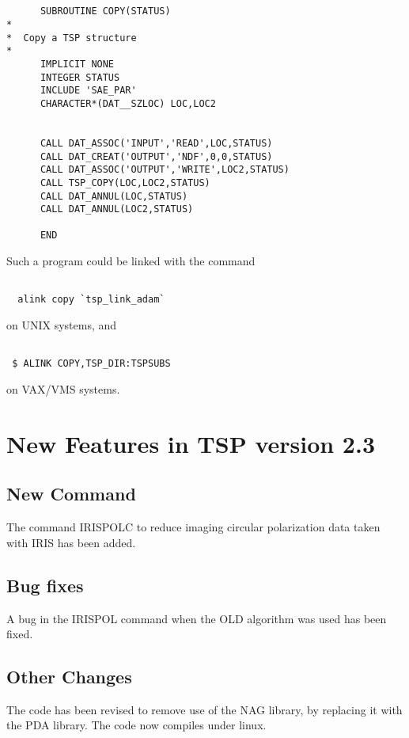 \begin{verbatim}


      SUBROUTINE COPY(STATUS)
*
*  Copy a TSP structure
*
      IMPLICIT NONE
      INTEGER STATUS
      INCLUDE 'SAE_PAR'
      CHARACTER*(DAT__SZLOC) LOC,LOC2


      CALL DAT_ASSOC('INPUT','READ',LOC,STATUS)
      CALL DAT_CREAT('OUTPUT','NDF',0,0,STATUS)
      CALL DAT_ASSOC('OUTPUT','WRITE',LOC2,STATUS)
      CALL TSP_COPY(LOC,LOC2,STATUS)
      CALL DAT_ANNUL(LOC,STATUS)
      CALL DAT_ANNUL(LOC2,STATUS)

      END

\end{verbatim}

Such a program could be linked with the command

\begin{verbatim}

  alink copy `tsp_link_adam`
\end{verbatim}
on UNIX systems, and


\begin{verbatim}

 $ ALINK COPY,TSP_DIR:TSPSUBS

\end{verbatim}
on VAX/VMS systems.

\section{New Features in TSP version 2.3}

\subsection{New Command}

The command IRISPOLC to reduce imaging circular polarization data taken with
IRIS has been added.

\subsection{Bug fixes}

A bug in the IRISPOL command when the OLD algorithm was used has been fixed.

\subsection{Other Changes}

The code has been revised to remove use of the NAG library, by replacing it
with the PDA library. The code now compiles under linux.

